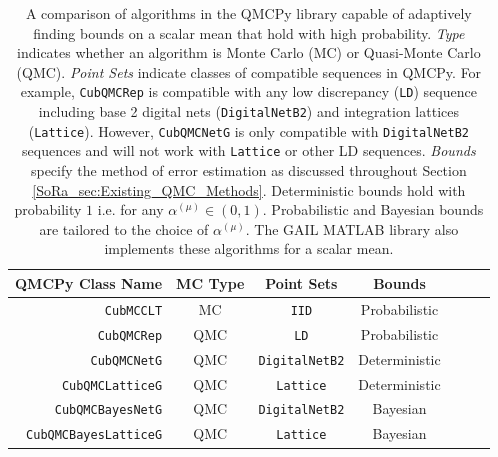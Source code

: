\documentclass[graybox]{svmult}
\begin{document}
\begin{table}[t]
\centering
\begin{tabular}{r c c c c c c}
    QMCPy Class Name & MC Type & Point Sets & Bounds \\
    \hline
    \texttt{CubMCCLT} \cite{cubmcg} & MC & \texttt{IID} & Probabilistic \\
    \texttt{CubQMCRep} \cite{mcbook} & QMC & \texttt{LD} & Probabilistic \\
    \texttt{CubQMCNetG} \cite{cubqmcsobol} & QMC & \texttt{DigitalNetB2} & Deterministic \\
    \texttt{CubQMCLatticeG} \cite{cubqmclattice} & QMC & \texttt{Lattice} & Deterministic \\
    \texttt{CubQMCBayesNetG} \cite{cubqmcbayessobol} & QMC &  \texttt{DigitalNetB2} & Bayesian \\
    \texttt{CubQMCBayesLatticeG} \cite{cubqmcbayeslattice} & QMC & \texttt{Lattice} & Bayesian \\
    \hline
\end{tabular}
\caption{A comparison of algorithms in the QMCPy library capable of adaptively finding bounds on a scalar mean that hold with high probability. \emph{Type} indicates whether an algorithm is Monte Carlo (MC) or Quasi-Monte Carlo (QMC). \emph{Point Sets} indicate classes of compatible sequences in QMCPy. For example, \texttt{CubQMCRep} is compatible with any low discrepancy (\texttt{LD}) sequence including base 2 digital nets (\texttt{DigitalNetB2}) and integration lattices (\texttt{Lattice}). However, \texttt{CubQMCNetG} is only compatible with \texttt{DigitalNetB2} sequences and will not work with \texttt{Lattice} or other LD sequences. \emph{Bounds} specify the method of error estimation as discussed throughout Section \ref{SoRa_sec:Existing_QMC_Methods}. Deterministic bounds hold with probability $1$ i.e. for any $\alpha^{(\mu)} \in (0,1)$. Probabilistic and Bayesian bounds are tailored to the choice of $\alpha^{(\mu)}$. The GAIL MATLAB library \cite{ChoEtal21a} also implements these algorithms for a scalar mean. }
\label{SoRa_table:qmcpy_sc}
\end{table}
\end{document}

